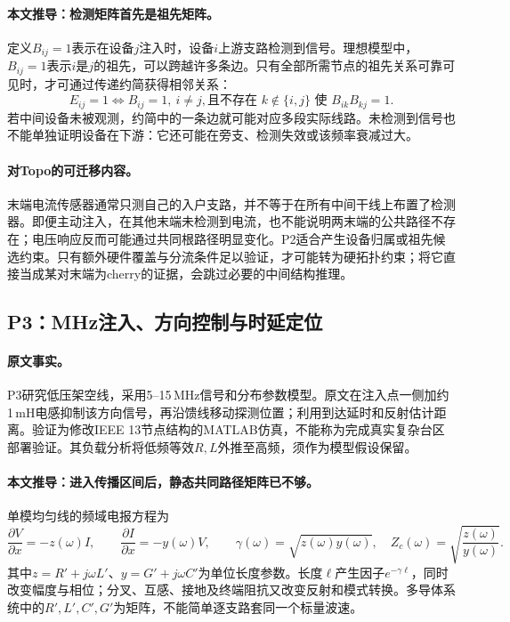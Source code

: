 \documentclass[UTF8,11pt,fontset=fandol]{ctexart}
\theoremstyle{remark}
\numberwithin{equation}{section}
\begin{document}
\paragraph{本文推导：检测矩阵首先是祖先矩阵。}
定义$B_{ij}=1$表示在设备$j$注入时，设备$i$上游支路检测到信号。理想模型中，$B_{ij}=1$表示$i$是$j$的祖先，可以跨越许多条边。只有全部所需节点的祖先关系可靠可见时，才可通过传递约简获得相邻关系：
\begin{equation}
 E_{ij}=1
 \Longleftrightarrow
 B_{ij}=1,\ i\ne j,
 \text{且不存在 }k\notin\{i,j\}\text{ 使 }B_{ik}B_{kj}=1.
 \label{eq:p2-transitive-reduction}
\end{equation}
若中间设备未被观测，约简中的一条边就可能对应多段实际线路。未检测到信号也不能单独证明设备在下游：它还可能在旁支、检测失效或该频率衰减过大。

\paragraph{对Topo的可迁移内容。}
末端电流传感器通常只测自己的入户支路，并不等于在所有中间干线上布置了检测器。即便主动注入，在其他末端未检测到电流，也不能说明两末端的公共路径不存在；电压响应反而可能通过共同根路径明显变化。P2适合产生设备归属或祖先候选约束。只有额外硬件覆盖与分流条件足以验证，才可能转为硬拓扑约束；将它直接当成某对末端为cherry的证据，会跳过必要的中间结构推理。

\subsection{P3：MHz注入、方向控制与时延定位}
\label{subsec:P3}

\paragraph{原文事实。}
P3\citep{P3}研究低压架空线，采用5--15\,MHz信号和分布参数模型。原文在注入点一侧加约1\,mH电感抑制该方向信号，再沿馈线移动探测位置；利用到达延时和反射估计距离。验证为修改IEEE 13节点结构的MATLAB仿真，不能称为完成真实复杂台区部署验证。其负载分析将低频等效$R,L$外推至高频，须作为模型假设保留。

\paragraph{本文推导：进入传播区间后，静态共同路径矩阵已不够。}
单模均匀线的频域电报方程为
\begin{equation}
 \frac{\partial V}{\partial x}=-z(\omega)I,\qquad
 \frac{\partial I}{\partial x}=-y(\omega)V,
 \qquad
 \gamma(\omega)=\sqrt{z(\omega)y(\omega)},\quad
 Z_c(\omega)=\sqrt{\frac{z(\omega)}{y(\omega)}}.
 \label{eq:p3-telegrapher}
\end{equation}
其中$z=R'+j\omega L'$、$y=G'+j\omega C'$为单位长度参数。长度$\ell$产生因子$e^{-\gamma\ell}$，同时改变幅度与相位；分叉、互感、接地及终端阻抗又改变反射和模式转换。多导体系统中的$R',L',C',G'$为矩阵，不能简单逐支路套同一个标量波速。
\end{document}
